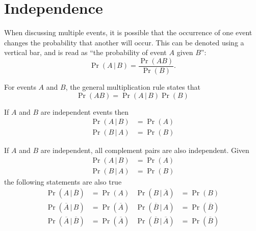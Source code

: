 \documentclass{article}
\begin{document}
\section{Independence}
\begin{definition}
    When discussing multiple events, it is possible that the occurrence of one event changes
    the probability that another will occur. This can be denoted using a vertical bar,
    and is read as ``the probability of event \(A\) given \(B\)'':
    \begin{equation*}
        \Pr{\left( A \,\vert\, B \right)} = \frac{\Pr{\left( A B \right)}}{\Pr{\left( B \right)}}.
    \end{equation*}
\end{definition}
\begin{definition}
    For events \(A\) and \(B\), the general multiplication rule states that
    \begin{equation*}
        \Pr{\left( A B \right)} = \Pr{\left( A \,\vert\, B \right)} \Pr{\left( B \right)}
    \end{equation*}
\end{definition}
\begin{theorem}
    If \(A\) and \(B\) are independent events then
    \begin{align*}
        \Pr{\left( A \,\vert\, B \right)} & = \Pr{\left( A \right)} \\
        \Pr{\left( B \,\vert\, A \right)} & = \Pr{\left( B \right)}
    \end{align*}
\end{theorem}
\begin{theorem}
    If \(A\) and \(B\) are independent, all complement pairs are also independent.
    Given
    \begin{align*}
        \Pr{\left( A \,\vert\, B \right)} & = \Pr{\left( A \right)} \\
        \Pr{\left( B \,\vert\, A \right)} & = \Pr{\left( B \right)}
    \end{align*}
    the following statements are also true
    \begin{align*}
        \Pr{\left( A \,\vert\, \overline{B} \right)}            & = \Pr{\left( A \right)}            & \Pr{\left( B \,\vert\, \overline{A} \right)}            & = \Pr{\left( B \right)}            \\
        \Pr{\left( \overline{A} \,\vert\, B \right)}            & = \Pr{\left( \overline{A} \right)} & \Pr{\left( \overline{B} \,\vert\, A \right)}            & = \Pr{\left( \overline{B} \right)} \\
        \Pr{\left( \overline{A} \,\vert\, \overline{B} \right)} & = \Pr{\left( \overline{A} \right)} & \Pr{\left( \overline{B} \,\vert\, \overline{A} \right)} & = \Pr{\left( \overline{B} \right)}
    \end{align*}
\end{theorem}
\end{document}
